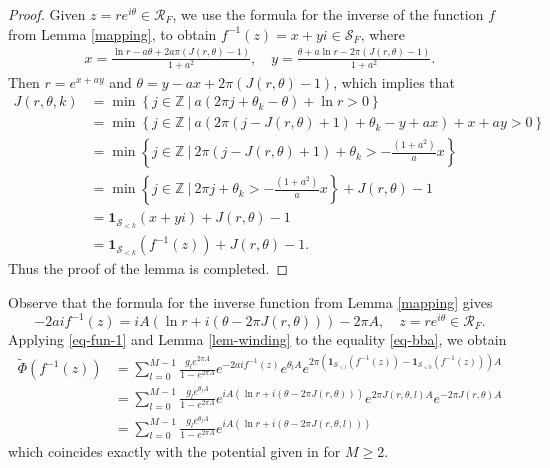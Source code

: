 \documentclass[11pt, letterpaper, reqno]{amsart}
\numberwithin{equation}{section}
\theoremstyle{definition}
\theoremstyle{plain}
\numberwithin{equation}{section}
\def\Z{\mathbb{Z}}
\def\RR{\mathcal{R}}
\def\SS{\mathcal{S}}
\begin{document}
\begin{proof}
Given $z = re^{i\theta}\in\RR_{F}$, we use the formula for the inverse of the function $f$ from Lemma \ref{mapping}, to obtain $f^{-1}(z) = x + yi\in \SS_{F}$, where 
\begin{align*}
x = \frac{\ln r - a\theta + 2a\pi(J(r,\theta) - 1)}{1 + a^{2}}, \quad  y=\frac{\theta + a\ln r - 2\pi(J(r,\theta) - 1) }{1 + a^{2}}.
\end{align*}
Then $r=e^{x+ay}$ and $\theta= y-ax + 2\pi(J(r,\theta) - 1)$, which implies that
\begin{align*}
J(r, \theta ,k ) & = \min \left\{ j\in \Z  \ | \  a(2\pi j + \theta_k -  \theta ) + \ln  r >0 \right\} \\
& = \min \left\{ j\in \Z  \ | \  a(2\pi(j-J(r,\theta) + 1) + \theta_k - y+ax) + x+ay >0 \right\} \\
& = \min \left\{ j\in \Z  \ | \  2\pi(j-J(r,\theta) + 1) + \theta_k > - \frac{(1+a^{2})}{a}x \right\} \\
& = \min \left\{ j\in \Z  \ | \  2\pi j + \theta_k > - \frac{(1+a^{2})}{a}x \right\} + J(r,\theta) - 1\\
& = \mathbf{1}_{\SS_{<k}}(x+yi) + J(r,\theta) - 1 \\
& = \mathbf{1}_{\SS_{<k}}(f^{-1}(z)) + J(r,\theta) - 1.
\end{align*}
Thus the proof of the lemma is completed.
\end{proof}
Observe that the formula for the inverse function from Lemma \ref{mapping} gives
\begin{equation}\label{eq-fun-1}
-2aif^{-1}(z) = iA(\ln r + i(\theta - 2\pi J(r,\theta))) - 2\pi A, \quad z=re^{i\theta}\in\RR_{F}.
\end{equation}
Applying \eqref{eq-fun-1} and Lemma \ref{lem-winding} to the equality \eqref{eq-bba}, we obtain
\begin{align*}
\tilde\Phi(f^{-1}(z)) &= \sum_{l=0}^{M-1} \frac{g_{l} e^{2\pi A}}{1-e^{2\pi A}} e^{-2aif^{-1}(z)}e^{\theta_{l}A}e^{2\pi\left(\mathbf{1}_{\SS_{<l}}(f^{-1}(z)) - \mathbf{1}_{\SS_{<0}}(f^{-1}(z))\right)A} \\
& = \sum_{l=0}^{M-1} \frac{g_{l}e^{\theta_{l}A}}{1-e^{2\pi A}} e^{iA(\ln r + i(\theta - 2\pi J(r,\theta)))} e^{2\pi J(r,\theta,l)A}e^{-2\pi J(r,\theta)A} \\
& = \sum_{l=0}^{M-1} \frac{g_{l}e^{\theta_{l}A}}{1-e^{2\pi A}} e^{iA(\ln r + i(\theta - 2\pi J(r,\theta,l)))}
\end{align*}
which coincides exactly with the potential given in \cite[eq. (1.31)]{CKO} for $M\ge 2$.
\end{document}
